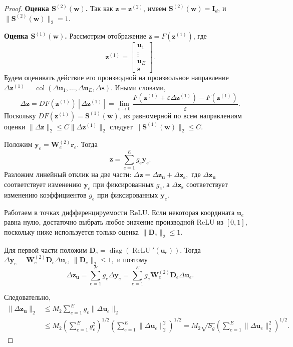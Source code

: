 \documentclass[11pt]{extarticle}
\DeclareMathOperator{\ReLU}{ReLU}
\DeclareMathOperator{\col}{col}
\theoremstyle{definition}
\theoremstyle{plain}
\theoremstyle{remark}
\begin{document}
\begin{proof}
\textbf{Оценка $\mathbf S^{(2)}(\mathbf w)$.}
Так как $\mathbf z=\mathbf z^{(2)}$, имеем
$
\mathbf S^{(2)}(\mathbf w)=\mathbf I_d$, и $
\|\mathbf S^{(2)}(\mathbf w)\|_2=1.
$

\textbf{Оценка $\mathbf S^{(1)}(\mathbf w)$.}
Рассмотрим отображение $\mathbf z=F(\mathbf z^{(1)})$, где
$$
\mathbf z^{(1)}
=
\begin{bmatrix}
\mathbf u_1\\
\vdots\\
\mathbf u_E\\
\mathbf s
\end{bmatrix}.
$$
Будем оценивать действие его производной на произвольное направление
$
\Delta\mathbf z^{(1)}
=
\col(\Delta\mathbf u_1,\ldots,\Delta\mathbf u_E,\Delta\mathbf s).
$
Иными словами,
$$
\Delta\mathbf z
=
DF(\mathbf z^{(1)})[\Delta\mathbf z^{(1)}]
=
\lim_{\varepsilon\to0}
\frac{
F(\mathbf z^{(1)}+\varepsilon\Delta\mathbf z^{(1)})
-
F(\mathbf z^{(1)})
}{\varepsilon}.
$$
Поскольку $DF(\mathbf z^{(1)})=\mathbf S^{(1)}(\mathbf w)$, из равномерной по всем направлениям оценки
$
\|\Delta\mathbf z\|_2\le C\|\Delta\mathbf z^{(1)}\|_2
$
следует
$
\|\mathbf S^{(1)}(\mathbf w)\|_2\le C.
$

Положим
$
\mathbf y_e=\mathbf W_e^{(2)}\mathbf r_e.
$
Тогда
$$
\mathbf z
=
\sum\limits_{e=1}^{E}g_e\mathbf y_e.
$$
Разложим линейный отклик на две части:
$
\Delta\mathbf z
=
\Delta\mathbf z_{\mathbf u}
+
\Delta\mathbf z_{\mathbf s},
$
где $\Delta\mathbf z_{\mathbf u}$ соответствует изменению $\mathbf y_e$ при фиксированных $g_e$, а $\Delta\mathbf z_{\mathbf s}$ соответствует изменению коэффициентов $g_e$ при фиксированных $\mathbf y_e$.

Работаем в точках дифференцируемости ReLU. Если некоторая координата $\mathbf u_e$ равна нулю, достаточно выбрать любое значение производной ReLU из $[0,1]$, поскольку ниже используется только оценка $\|\mathbf D_e\|_2\le 1$.

Для первой части положим
$
\mathbf D_e=\operatorname{diag}(\ReLU'(\mathbf u_e)).
$
Тогда
$
\Delta\mathbf y_e
=
\mathbf W_e^{(2)}\mathbf D_e\Delta\mathbf u_e$,
$\|\mathbf D_e\|_2\le 1,
$
и поэтому
$$
\Delta\mathbf z_{\mathbf u}
=
\sum\limits_{e=1}^{E}
g_e\Delta\mathbf y_e
=
\sum\limits_{e=1}^{E}
g_e\mathbf W_e^{(2)}\mathbf D_e\Delta\mathbf u_e.
$$

Следовательно,
$$
\begin{aligned}
\|\Delta\mathbf z_{\mathbf u}\|_2
&\le
M_2
\sum\limits_{e=1}^{E}
g_e\|\Delta\mathbf u_e\|_2 \\
&\le
M_2
\left(
\sum\limits_{e=1}^{E}g_e^2
\right)^{1/2}
\left(
\sum\limits_{e=1}^{E}\|\Delta\mathbf u_e\|_2^2
\right)^{1/2} 
=
M_2\sqrt{S_g}
\left(
\sum\limits_{e=1}^{E}\|\Delta\mathbf u_e\|_2^2
\right)^{1/2}.
\end{aligned}
$$


\end{proof}
\end{document}
